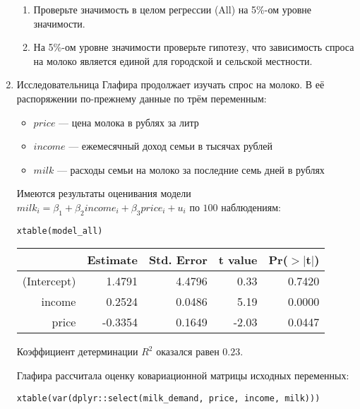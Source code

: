 \documentclass[12pt, a4paper]{article}
\theoremstyle{definition}
\begin{document}
\begin{enumerate}
\begin{enumerate}
\item Проверьте значимость в целом регрессии (All) на 5\%-ом уровне значимости.
\item На 5\%-ом уровне значимости проверьте гипотезу, что зависимость спроса на молоко является единой для городской и сельской местности.
\end{enumerate}

\item Исследовательница Глафира продолжает изучать спрос на молоко. В её распоряжении по-прежнему данные по трём переменным:
\begin{itemize}
\item $price$ — цена молока в рублях за литр
\item $income$ — ежемесячный доход семьи в тысячах рублей
\item $milk$ — расходы семьи на молоко за последние семь дней в рублях
\end{itemize}

Имеются результаты оценивания модели $milk_i = \beta_1 + \beta_2 income_i + \beta_3 price_i + u_i$ по $100$ наблюдениям:
\begin{verbatim}
xtable(model_all)
\end{verbatim}


\begin{tabular}{rrrrr}
  \hline
 & Estimate & Std. Error & t value & Pr($>$$|$t$|$) \\
  \hline
(Intercept) & 1.4791 & 4.4796 & 0.33 & 0.7420 \\
  income & 0.2524 & 0.0486 & 5.19 & 0.0000 \\
  price & -0.3354 & 0.1649 & -2.03 & 0.0447 \\
   \hline
\end{tabular}



Коэффициент детерминации $R^2$ оказался равен $0.23$.


Глафира рассчитала оценку ковариационной матрицы исходных переменных:

\begin{verbatim}
xtable(var(dplyr::select(milk_demand, price, income, milk)))
\end{verbatim}



\end{enumerate}
\end{document}
